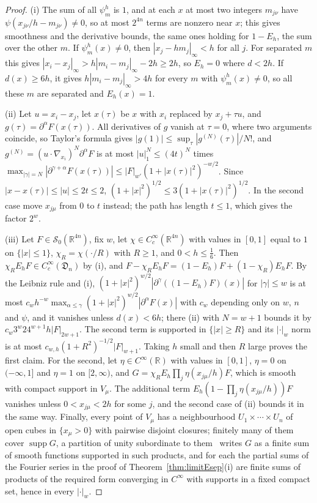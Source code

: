 \documentclass[aps,prd,twocolumn,superscriptaddress,nofootinbib,longbibliography,floatfix,amsmath,amssymb,10pt]{revtex4-2}
\theoremstyle{definition}
\theoremstyle{remark}
\newcommand{\R}{\mathbb{R}}
\begin{document}
\begin{proof}
(i) The sum of all $\psi^h_m$ is $1$, and at each $x$ at most two integers
$m_{j\nu}$ have $\psi(x_{j\nu}/h-m_{j\nu})\ne0$, so at most $2^{4n}$ terms are
nonzero near $x$; this gives smoothness and the derivative bounds, the same
ones holding for $1-E_h$, the sum over the other $m$. If $\psi^h_m(x)\ne0$,
then $|x_j-hm_j|_\infty<h$ for all $j$. For separated $m$ this gives
$|x_i-x_j|_\infty>h|m_i-m_j|_\infty-2h\ge2h$, so $E_h=0$ where $d<2h$. If
$d(x)\ge6h$, it gives $h|m_i-m_j|_\infty>4h$ for every $m$ with
$\psi^h_m(x)\ne0$, so all these $m$ are separated and $E_h(x)=1$.

(ii) Let $u=x_i-x_j$, let $x(\tau)$ be $x$ with $x_i$ replaced by $x_j+\tau
u$, and $g(\tau)=\partial^\alpha F(x(\tau))$. All derivatives of $g$ vanish
at $\tau=0$, where two arguments coincide, so Taylor's formula gives
$|g(1)|\le\sup_\tau|g^{(N)}(\tau)|/N!$, and $g^{(N)}=(u\cdot\nabla_{x_i})^N
\partial^\alpha F$ is at most $|u|_1^N\le(4t)^N$ times $\max_{|\gamma|=N}
|\partial^{\gamma+\alpha}F(x(\tau))|\le|F|_{w'}(1+|x(\tau)|^2)^{-w/2}$. Since
$|x-x(\tau)|\le|u|\le2t\le2$, $(1+|x|^2)^{1/2}\le3(1+|x(\tau)|^2)^{1/2}$. In the
second case move $x_{j\mu}$ from $0$ to $t$ instead; the path has length
$t\le1$, which gives the factor $2^w$.

(iii) Let $F\in\mathcal S_0(\R^{4n})$, fix $w$, let $\chi\in C^\infty_c(
\R^{4n})$ with values in $[0,1]$ equal to $1$ on $\{|x|\le1\}$, $\chi_R=\chi(
\cdot/R)$ with $R\ge1$, and $0<h\le\frac16$. Then $\chi_RE_hF\in C^\infty_c(
\mathfrak D_n)$ by (i), and $F-\chi_RE_hF=(1-E_h)F+(1-\chi_R)E_hF$. By the
Leibniz rule and (i), $(1+|x|^2)^{w/2}|\partial^\gamma((1-E_h)F)(x)|$ for
$|\gamma|\le w$ is at most $c_wh^{-w}\max_{\alpha\le\gamma}(1+|x|^2)^{w/2}
|\partial^\alpha F(x)|$ with $c_w$ depending only on $w$, $n$ and $\psi$, and
it vanishes unless $d(x)<6h$; there (ii) with $N=w+1$ bounds it by
$c_w3^w24^{w+1}h|F|_{2w+1}$. The second term is supported in $\{|x|\ge R\}$
and its $|\cdot|_w$ norm is at most $c_{w,h}(1+R^2)^{-1/2}|F|_{w+1}$. Taking
$h$ small and then $R$ large proves the first claim. For the second, let
$\eta\in C^\infty(\R)$ with values in $[0,1]$, $\eta=0$ on $(-\infty,1]$ and
$\eta=1$ on $[2,\infty)$, and $G=\chi_RE_h\prod_j\eta(x_{j\mu}/h)F$, which is
smooth with compact support in $V_\mu$. The additional term
$E_h(1-\prod_j\eta(x_{j\mu}/h))F$ vanishes unless $0<x_{j\mu}<2h$ for some
$j$, and the second case of (ii) bounds it in the same way. Finally, every
point of $V_\mu$ has a neighbourhood $U_1\times\cdots\times U_n$ of open
cubes in $\{x_\mu>0\}$ with pairwise disjoint closures; finitely many of them
cover $\operatorname{supp}G$, a partition of unity
subordinate to them~\cite[Sect.~1.4]{Hor03} writes $G$ as a finite sum of
smooth functions supported in such products, and for each the partial sums
of the Fourier series in the proof of Theorem~\ref{thm:limitEsep}(i) are
finite sums of products of the required form converging in
$C^\infty$ with supports in a fixed compact set, hence in every $|\cdot|_w$.
\end{proof}
\end{document}
